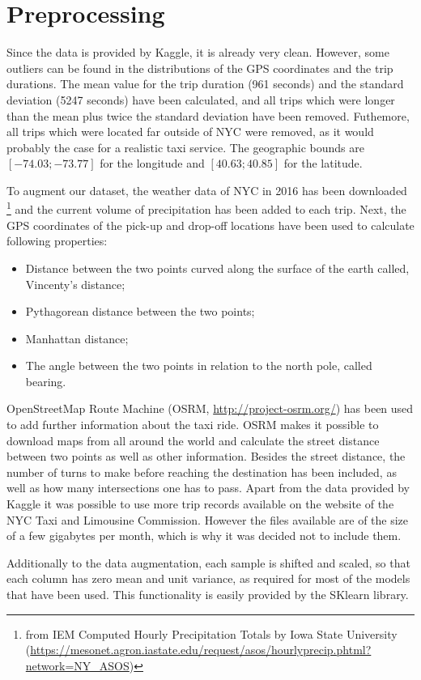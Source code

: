 \documentclass[a4paper]{article}
\begin{document}
\section{Preprocessing}
Since the data is provided by Kaggle, it is already very clean. However, some
outliers can be found in the distributions of the GPS coordinates and the trip
durations. The mean value for the trip duration (961 seconds) and the standard
deviation (5247 seconds) have been calculated, and all trips which were longer
than the mean plus twice the standard deviation have been removed. Futhemore,
all trips which were located far outside of NYC were removed, as it would
probably the case for a realistic taxi service. The geographic bounds are
$[-74.03;-73.77]$ for the longitude and $[40.63;40.85]$ for the latitude.

To augment our  dataset, the weather data of NYC in 2016 has been downloaded
\footnote{from IEM Computed Hourly Precipitation Totals by Iowa State University
(\url{https://mesonet.agron.iastate.edu/request/asos/hourlyprecip.phtml?network=NY_ASOS})}
and the current volume of precipitation has been added to each trip. Next, the
GPS coordinates of the pick-up and drop-off locations have been used to calculate
following properties:
\begin{itemize}
    \item Distance between the two points curved along the surface of the
earth called, Vincenty's distance;
    \item Pythagorean distance between the two points;
    \item Manhattan distance;
    \item The angle between the two points in relation to the north pole, called
    bearing.
\end{itemize}
OpenStreetMap Route Machine (OSRM, \url{http://project-osrm.org/}) has been used
to add further information about the taxi ride. OSRM makes it possible to
download maps from all around the world and calculate the street distance
between two points as well as other information. Besides the street distance,
the number of turns to make before reaching the destination has been included,
as well as how many intersections one has to pass. Apart from the data provided
by Kaggle it was possible to use more trip records available on the website of
the NYC Taxi and Limousine Commission. However the files available are of the
size of a few gigabytes per month, which is why it was decided not to include
them.

Additionally to the data augmentation, each sample is shifted and scaled, so
that each column has zero mean and unit variance, as required for most of the
models that have been used. This functionality is easily provided by the SKlearn
library.
\end{document}
